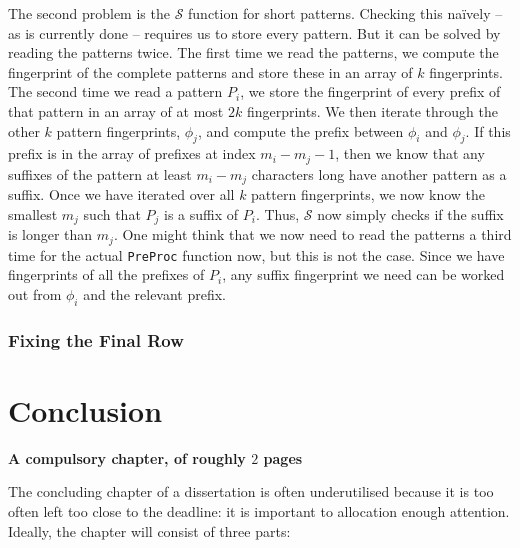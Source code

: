\documentclass[ %
                    author={Dominic Joseph Moylett},
                    degree={MEng},
                     title={Dictionary Matching with Fingerprints},
                  subtitle={An Empirical Analysis},
                      type={research},
                      year={2015} ]{dissertation}
\begin{document}
The second problem is the $\mathcal{S}$ function for short patterns. Checking this na\"{i}vely -- as is currently done -- requires us to store every pattern. But it can be solved by reading the patterns twice. The first time we read the patterns, we compute the fingerprint of the complete patterns and store these in an array of $k$ fingerprints. The second time we read a pattern $P_i$, we store the fingerprint of every prefix of that pattern in an array of at most $2k$ fingerprints. We then iterate through the other $k$ pattern fingerprints, $\phi_j$, and compute the prefix between $\phi_i$ and $\phi_j$. If this prefix is in the array of prefixes at index $m_i - m_j - 1$, then we know that any suffixes of the pattern at least $m_i - m_j$ characters long have another pattern as a suffix. Once we have iterated over all $k$ pattern fingerprints, we now know the smallest $m_j$ such that $P_j$ is a suffix of $P_i$. Thus, $\mathcal{S}$ now simply checks if the suffix is longer than $m_j$. One might think that we now need to read the patterns a third time for the actual \texttt{PreProc} function now, but this is not the case. Since we have fingerprints of all the prefixes of $P_i$, any suffix fingerprint we need can be worked out from $\phi_i$ and the relevant prefix.

\subsection{Fixing the Final Row}


\chapter{Conclusion}
\label{chap:conclusion}

{\bf A compulsory chapter, of roughly $2$ pages} 
\vspace{1cm} 

\noindent
The concluding chapter of a dissertation is often underutilised because it 
is too often left too close to the deadline: it is important to allocation
enough attention.  Ideally, the chapter will consist of three parts:
\end{document}
